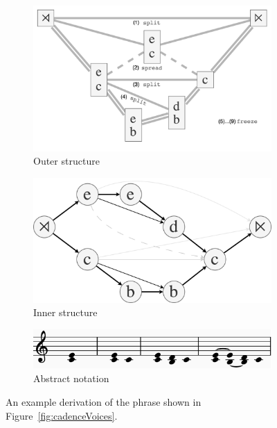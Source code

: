 \documentclass[12pt,a4paper,twoside,openright]{report}
\theoremstyle{definition}
\begin{document}
\begin{figure}
  \centering
  \begin{subfigure}[t]{.55\textwidth}
    \centering\includegraphics[keepaspectratio,width=\textwidth]{prep/cadenceouterder.png}
    \caption{Outer structure}
    \label{fig:cadenceOuterDer}
  \end{subfigure}
  \begin{subfigure}[t]{.42\textwidth}
    \centering\includegraphics[keepaspectratio,width=\textwidth]{prep/cadenceinnerder.png}
    \caption{Inner structure}
    \label{fig:cadenceInnerDer}
  \end{subfigure}
  \begin{subfigure}[t]{.8\textwidth}
    \centering\includegraphics[keepaspectratio,width=\textwidth]{prep/cadencederivation.png}
    \caption{Abstract notation}
    \label{fig:cadenceDerivation}
  \end{subfigure}


  \captionsetup{width=.9\linewidth}
  \caption{An example derivation of the phrase shown in Figure~\ref{fig:cadenceVoices}. }
  \label{fig:innerOuterStructure}
\end{figure}
\end{document}
